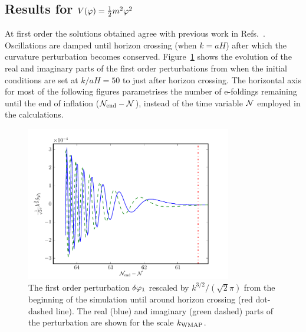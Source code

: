 \subsection{Results for \texorpdfstring{$V(\varphi)=\frac{1}{2} m^2 \varphi^2$}{m-squared Model}}
\label{sec:msqphisq-res}

At first order the solutions obtained agree with previous work in
Refs.~\cite{Salopek:1988qh, Martin:2006rs, Ringeval:2007am}. Oscillations
are damped until horizon crossing (when $k=aH$) after which the
curvature perturbation becomes conserved. Figure~\ref{fig:dp1} shows the evolution of
the real and imaginary parts of the first order perturbations from
when the initial conditions are set at $k/aH=50$ to just after horizon
crossing. The horizontal axis for most of the following figures parametrises the
number of e-foldings remaining until the end of inflation ($\mathcal{N}_\mathrm{end}-\mathcal{N}$),
instead
of the time variable $\mathcal{N}$ employed in the calculations.
%
% 
\begin{figure}[htbp]
 \centering
 \includegraphics[width=0.8\textwidth]{numerical/graphs/dp1_kwmap}
 \caption[First Order Perturbation]{The first order perturbation $\delta\varphi_{1}$ rescaled by
$k^{3/2}/(\sqrt{2}\pi)$ from the beginning of the simulation until around
horizon crossing (red dot-dashed line). The real (blue) and imaginary (green
dashed) parts of the perturbation are shown for the scale $k_\mathrm{WMAP}$.}
\label{fig:dp1}
\end{figure}
% 



